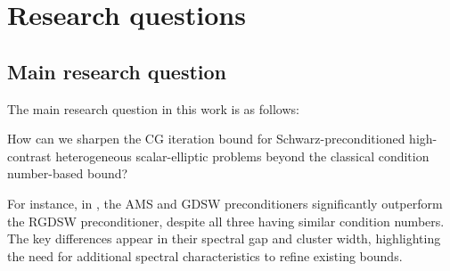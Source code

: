 \chapter{Research questions}\label{ch:questions}
\section{Main research question}
The main research question in this work is as follows:
\begin{researchq} \label{rq:main}
    \par
    How can we sharpen the CG iteration bound for Schwarz-preconditioned high-contrast heterogeneous scalar-elliptic problems beyond the classical condition number-based bound?
\end{researchq}
For instance, in \cite{ams_coarse_space_comp_study_Alves2024}, the AMS and GDSW preconditioners significantly outperform the RGDSW preconditioner, despite all three having similar condition numbers. The key differences appear in their spectral gap and cluster width, highlighting the need for additional spectral characteristics to refine existing bounds.

